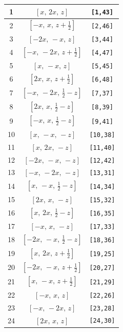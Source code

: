 \documentclass[fleqn,8pt]{jsarticle}
\begin{document}
\begin{longtable}{ccc}
1 & $\left[ x,\, 2 x,\, z \right]$ & {\tt [1,43]} \\ \hline
2 & $\left[ - x,\, x,\, z + \frac{1}{2} \right]$ & {\tt [2,46]} \\ \hline
3 & $\left[ - 2 x,\, - x,\, z \right]$ & {\tt [3,44]} \\ \hline
4 & $\left[ - x,\, - 2 x,\, z + \frac{1}{2} \right]$ & {\tt [4,47]} \\ \hline
5 & $\left[ x,\, - x,\, z \right]$ & {\tt [5,45]} \\ \hline
6 & $\left[ 2 x,\, x,\, z + \frac{1}{2} \right]$ & {\tt [6,48]} \\ \hline
7 & $\left[ - x,\, - 2 x,\, \frac{1}{2} - z \right]$ & {\tt [7,37]} \\ \hline
8 & $\left[ 2 x,\, x,\, \frac{1}{2} - z \right]$ & {\tt [8,39]} \\ \hline
9 & $\left[ - x,\, x,\, \frac{1}{2} - z \right]$ & {\tt [9,41]} \\ \hline
10 & $\left[ x,\, - x,\, - z \right]$ & {\tt [10,38]} \\ \hline
11 & $\left[ x,\, 2 x,\, - z \right]$ & {\tt [11,40]} \\ \hline
12 & $\left[ - 2 x,\, - x,\, - z \right]$ & {\tt [12,42]} \\ \hline
13 & $\left[ - x,\, - 2 x,\, - z \right]$ & {\tt [13,31]} \\ \hline
14 & $\left[ x,\, - x,\, \frac{1}{2} - z \right]$ & {\tt [14,34]} \\ \hline
15 & $\left[ 2 x,\, x,\, - z \right]$ & {\tt [15,32]} \\ \hline
16 & $\left[ x,\, 2 x,\, \frac{1}{2} - z \right]$ & {\tt [16,35]} \\ \hline
17 & $\left[ - x,\, x,\, - z \right]$ & {\tt [17,33]} \\ \hline
18 & $\left[ - 2 x,\, - x,\, \frac{1}{2} - z \right]$ & {\tt [18,36]} \\ \hline
19 & $\left[ x,\, 2 x,\, z + \frac{1}{2} \right]$ & {\tt [19,25]} \\ \hline
20 & $\left[ - 2 x,\, - x,\, z + \frac{1}{2} \right]$ & {\tt [20,27]} \\ \hline
21 & $\left[ x,\, - x,\, z + \frac{1}{2} \right]$ & {\tt [21,29]} \\ \hline
22 & $\left[ - x,\, x,\, z \right]$ & {\tt [22,26]} \\ \hline
23 & $\left[ - x,\, - 2 x,\, z \right]$ & {\tt [23,28]} \\ \hline
24 & $\left[ 2 x,\, x,\, z \right]$ & {\tt [24,30]} \\
\end{longtable}
\end{document}
